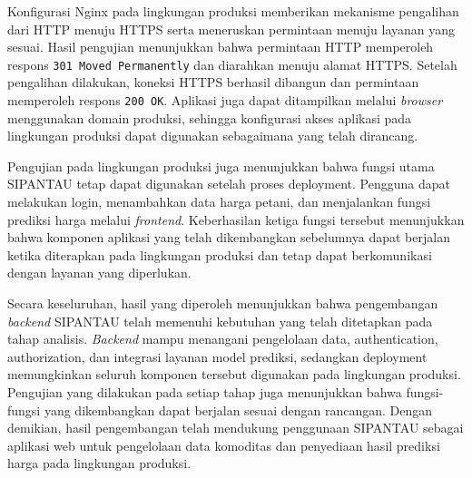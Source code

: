 Konfigurasi Nginx pada lingkungan produksi memberikan mekanisme pengalihan dari HTTP menuju HTTPS serta meneruskan permintaan menuju layanan yang sesuai. Hasil pengujian menunjukkan bahwa permintaan HTTP memperoleh respons \texttt{301 Moved Permanently} dan diarahkan menuju alamat HTTPS. Setelah pengalihan dilakukan, koneksi HTTPS berhasil dibangun dan permintaan memperoleh respons \texttt{200 OK}. Aplikasi juga dapat ditampilkan melalui \textit{browser} menggunakan domain produksi, sehingga konfigurasi akses aplikasi pada lingkungan produksi dapat digunakan sebagaimana yang telah dirancang.

Pengujian pada lingkungan produksi juga menunjukkan bahwa fungsi utama SIPANTAU tetap dapat digunakan setelah proses deployment. Pengguna dapat melakukan login, menambahkan data harga petani, dan menjalankan fungsi prediksi harga melalui \textit{frontend}. Keberhasilan ketiga fungsi tersebut menunjukkan bahwa komponen aplikasi yang telah dikembangkan sebelumnya dapat berjalan ketika diterapkan pada lingkungan produksi dan tetap dapat berkomunikasi dengan layanan yang diperlukan.

Secara keseluruhan, hasil yang diperoleh menunjukkan bahwa pengembangan \textit{backend} SIPANTAU telah memenuhi kebutuhan yang telah ditetapkan pada tahap analisis. \textit{Backend} mampu menangani pengelolaan data, authentication, authorization, dan integrasi layanan model prediksi, sedangkan deployment memungkinkan seluruh komponen tersebut digunakan pada lingkungan produksi. Pengujian yang dilakukan pada setiap tahap juga menunjukkan bahwa fungsi-fungsi yang dikembangkan dapat berjalan sesuai dengan rancangan. Dengan demikian, hasil pengembangan telah mendukung penggunaan SIPANTAU sebagai aplikasi web untuk pengelolaan data komoditas dan penyediaan hasil prediksi harga pada lingkungan produksi.